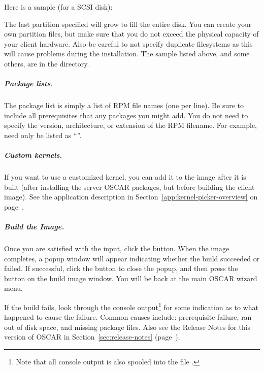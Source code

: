 Here is a sample (for a SCSI disk):




The last partition specified will grow to fill the entire disk.  You
can create your own partition files, but make sure that you do not
exceed the physical capacity of your client hardware. Also be careful
to not specify duplicate filesystems as this will cause problems 
during the installation. The sample listed above, and some others, 
are in the  directory.

\subparagraph{Package lists.}

The package list is simply a list of RPM file names (one per line). Be
sure to include all prerequisites that any packages you might add.
You do not need to specify the version, architecture, or extension of
the RPM filename.  For example,  need only
be listed as ``''.

\subparagraph{Custom kernels.}

If you want to use a customized kernel, you can add it to the image
after it is built (after installing the server OSCAR packages, but
before building the client image).  See the 
application description in Section~\ref{app:kernel-picker-overview} on
page~\pageref{app:kernel-picker-overview}.

\subparagraph{Build the Image.}

Once you are satisfied with the input, click the 
button.  When the image completes, a popup window will appear
indicating whether the build succeeded or failed.  If successful,
click the  button to close the popup, and then press the
 button on the build image window.  You will be back at
the main OSCAR wizard menu.

If the build fails, look through the console output\footnote{Note that
  all console output is also spooled into the file
  .} for some indication as to what happened to
cause the failure.  Common causes include: prerequisite failure, ran
out of disk space, and missing package files.  Also see the Release
Notes for this version of OSCAR in Section~\ref{sec:release-notes}
(page~\pageref{sec:release-notes}).



